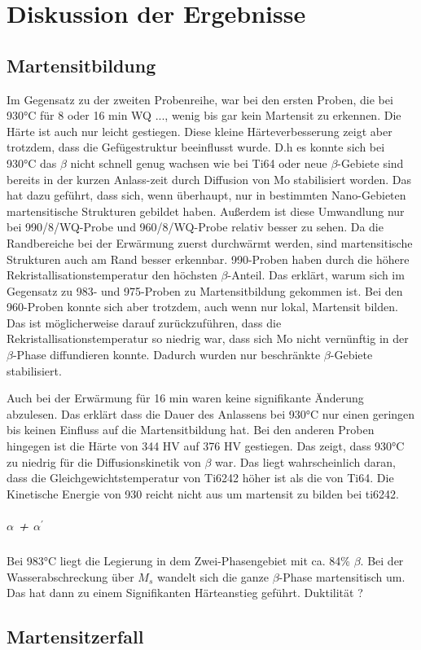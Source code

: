 \chapter{Diskussion der Ergebnisse}

\section{Martensitbildung}


Im Gegensatz zu der zweiten Probenreihe, war  bei den ersten Proben, die bei 930°C für 8   oder 16 min WQ ..., wenig bis gar kein Martensit zu erkennen. Die Härte ist auch nur leicht gestiegen. Diese kleine Härteverbesserung zeigt aber trotzdem, dass  die Gefügestruktur  beeinflusst wurde. D.h es konnte sich bei 930°C das $\beta$ nicht schnell genug wachsen wie bei Ti64 oder neue $\beta$-Gebiete sind bereits in der kurzen Anlass-zeit  durch Diffusion von Mo stabilisiert worden. 
Das hat dazu geführt, dass sich, wenn überhaupt, nur in bestimmten Nano-Gebieten martensitische Strukturen gebildet haben. Außerdem ist diese Umwandlung nur bei  990/8/WQ-Probe und 960/8/WQ-Probe relativ besser zu sehen. Da die Randbereiche bei der Erwärmung zuerst durchwärmt werden, sind martensitische Strukturen auch am Rand besser erkennbar.
990-Proben haben durch die höhere Rekristallisationstemperatur den höchsten $\beta$-Anteil. Das erklärt, warum sich im Gegensatz zu 983- und 975-Proben zu Martensitbildung gekommen ist.
Bei den 960-Proben konnte sich aber trotzdem, auch wenn nur  lokal, Martensit bilden. Das ist möglicherweise darauf zurückzuführen, dass die Rekristallisationstemperatur  so niedrig war, dass sich Mo nicht vernünftig  in der $\beta$-Phase diffundieren konnte. Dadurch wurden nur beschränkte $\beta$-Gebiete stabilisiert.

Auch bei der Erwärmung für 16 min waren keine signifikante Änderung abzulesen. Das erklärt dass die Dauer des Anlassens bei 930°C nur einen geringen bis keinen Einfluss auf die Martensitbildung hat. 
Bei den anderen Proben hingegen ist die Härte von 344 HV auf 376 HV gestiegen. 
Das zeigt, dass 930°C zu niedrig  für die Diffusionskinetik von $\beta$ war. Das liegt wahrscheinlich daran, dass die Gleichgewichtstemperatur von Ti6242 höher ist als die von Ti64. Die Kinetische Energie von 930 reicht nicht aus um martensit zu bilden bei ti6242.

\paragraph{$\alpha$ + $\alpha^\prime$}

Bei 983°C  liegt die Legierung in dem  Zwei-Phasengebiet mit ca. 84\% $\beta$. Bei der Wasserabschreckung über $M_s$ wandelt sich die ganze $\beta$-Phase martensitisch um. Das hat dann zu einem Signifikanten Härteanstieg geführt. Duktilität ?


\section{Martensitzerfall}